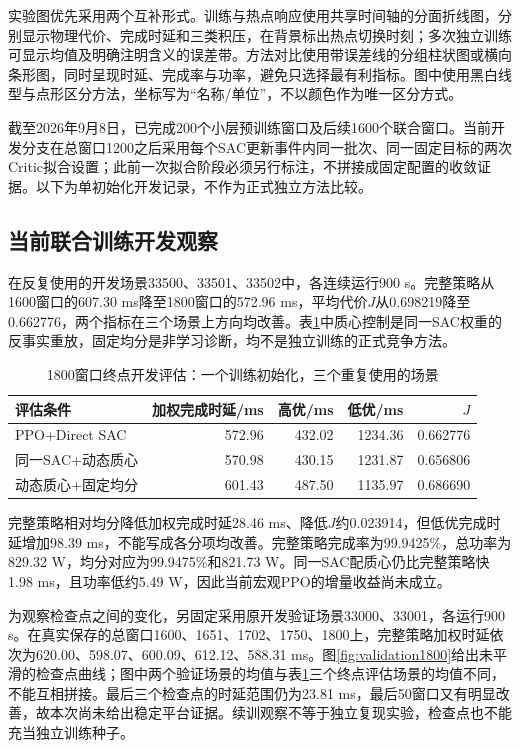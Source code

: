 实验图优先采用两个互补形式。训练与热点响应使用共享时间轴的分面折线图，分别显示物理代价、完成时延和三类积压，在背景标出热点切换时刻；多次独立训练可显示均值及明确注明含义的误差带。方法对比使用带误差线的分组柱状图或横向条形图，同时呈现时延、完成率与功率，避免只选择最有利指标。图中使用黑白线型与点形区分方法，坐标写为“名称/单位”，不以颜色作为唯一区分方式。

截至2026年9月8日，已完成200个小层预训练窗口及后续1600个联合窗口。当前开发分支在总窗口1200之后采用每个SAC更新事件内同一批次、同一固定目标的两次Critic拟合设置；此前一次拟合阶段必须另行标注，不拼接成固定配置的收敛证据。以下为单初始化开发记录，不作为正式独立方法比较。

\subsection{当前联合训练开发观察}
在反复使用的开发场景33500、33501、33502中，各连续运行900 s。完整策略从1600窗口的607.30 ms降至1800窗口的572.96 ms，平均代价$J$从0.698219降至0.662776，两个指标在三个场景上方向均改善。表\ref{tab:pilot1800}中质心控制是同一SAC权重的反事实重放，固定均分是非学习诊断，均不是独立训练的正式竞争方法。

\begin{table}[t]
\centering
\caption{1800窗口终点开发评估：一个训练初始化，三个重复使用的场景}
\label{tab:pilot1800}
\small
\begin{tabular}{lrrrr}
\hline
评估条件 & 加权完成时延/ms & 高优/ms & 低优/ms & $J$ \\
\hline
PPO+Direct SAC & 572.96 & 432.02 & 1234.36 & 0.662776 \\
同一SAC+动态质心 & 570.98 & 430.15 & 1231.87 & 0.656806 \\
动态质心+固定均分 & 601.43 & 487.50 & 1135.97 & 0.686690 \\
\hline
\end{tabular}
\end{table}

完整策略相对均分降低加权完成时延28.46 ms、降低$J$约0.023914，但低优完成时延增加98.39 ms，不能写成各分项均改善。完整策略完成率为99.9425\%，总功率为829.32 W，均分对应为99.9475\%和821.73 W。同一SAC配质心仍比完整策略快1.98 ms，且功率低约5.49 W，因此当前宏观PPO的增量收益尚未成立。

为观察检查点之间的变化，另固定采用原开发验证场景33000、33001，各运行900 s。在真实保存的总窗口1600、1651、1702、1750、1800上，完整策略加权时延依次为620.00、598.07、600.09、612.12、588.31 ms。图\ref{fig:validation1800}给出未平滑的检查点曲线；图中两个验证场景的均值与表\ref{tab:pilot1800}三个终点评估场景的均值不同，不能互相拼接。最后三个检查点的时延范围仍为23.81 ms，最后50窗口又有明显改善，故本次尚未给出稳定平台证据。续训观察不等于独立复现实验，检查点也不能充当独立训练种子。

